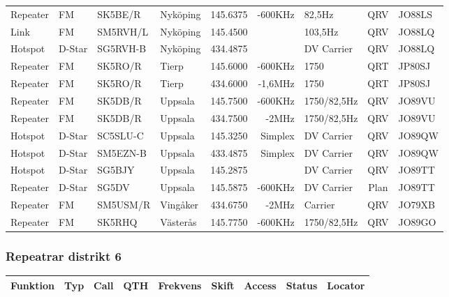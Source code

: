 \begin{landscape}
\begin{longtable}{llllrrlcl}
Repeater & FM     & SK5BE/R  & Nyköping          & 145.6375 & -600KHz & 82,5Hz        & QRV  & JO88LS \\
Link     & FM     & SM5RVH/L & Nyköping          & 145.4500 &         & 103,5Hz       & QRV  & JO88LQ \\
Hotspot  & D-Star & SG5RVH-B & Nyköping          & 434.4875 &         & DV Carrier    & QRV  & JO88LQ \\
Repeater & FM     & SK5RO/R  & Tierp             & 145.6000 & -600KHz & 1750          & QRT  & JP80SJ \\
Repeater & FM     & SK5RO/R  & Tierp             & 434.6000 & -1,6MHz & 1750          & QRT  & JP80SJ \\
Repeater & FM     & SK5DB/R  & Uppsala           & 145.7500 & -600KHz & 1750/82,5Hz   & QRV  & JO89VU \\
Repeater & FM     & SK5DB/R  & Uppsala           & 434.7500 & -2MHz   & 1750/82,5Hz   & QRV  & JO89VU \\
Hotspot  & D-Star & SC5SLU-C & Uppsala           & 145.3250 & Simplex & DV Carrier    & QRV  & JO89QW \\
Hotspot  & D-Star & SM5EZN-B & Uppsala           & 433.4875 & Simplex & DV Carrier    & QRV  & JO89QW \\
Hotspot  & D-Star & SG5BJY   & Uppsala           & 145.2875 &         & DV Carrier    & QRV  & JO89TT \\
Repeater & D-Star & SG5DV    & Uppsala           & 145.5875 & -600KHz & DV Carrier    & Plan & JO89TT \\
Repeater & FM     & SM5USM/R & Vingåker          & 434.6750 & -2MHz   & Carrier       & QRV  & JO79XB \\
Repeater & FM     & SK5RHQ   & Västerås          & 145.7750 & -600KHz & 1750/82,5Hz   & QRV  & JO89GO

\end{longtable}
\normalsize
\subsubsection{Repeatrar distrikt 6}
\footnotesize
\begin{longtable}{llllrrlcl}

\textbf{Funktion} & \textbf{Typ}    & \textbf{Call} & \textbf{QTH} & \textbf{Frekvens} & \textbf{Skift} & 
\textbf{Access}   & \textbf{Status} & \textbf{Locator} \\ \hline \endhead


\end{longtable}
\end{landscape}
